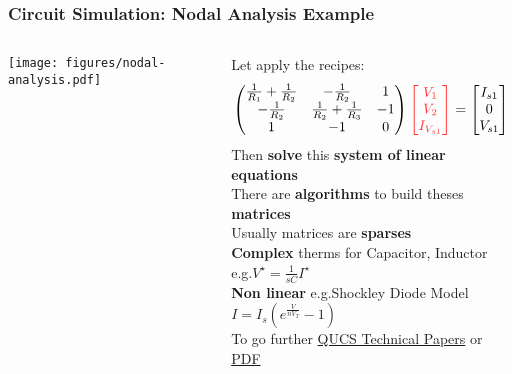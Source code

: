 \begin{frame}
  \frametitle{Circuit Simulation: Nodal Analysis Example}
  \begin{columns}
    \begin{column}{.3\textwidth}
      \begin{center}
        \texttt{[image: figures/nodal-analysis.pdf]}
      \end{center}
    \end{column}
    \begin{column}{.7\textwidth}
      Let apply the recipes: %
      $$
      \begin{pmatrix}
        \frac{1}{R_1}+\frac{1}{R_2} & -\frac{1}{R_2} & 1 \\
        -\frac{1}{R_2} & \frac{1}{R_2}+\frac{1}{R_3} & -1 \\
        1 & -1 & 0
      \end{pmatrix}
      { \color{red!80}
      \begin{bmatrix}
        V_1 \\
        V_2 \\
        I_{V_{s1}}
      \end{bmatrix}
      }
      =
      \begin{bmatrix}
        I_{s1} \\
        0 \\
        V_{s1}
      \end{bmatrix}
      $$
      Then \textbf{solve} this \textbf{system of linear equations} \\[1em]
      There are \textbf{algorithms} to build theses \textbf{matrices} \\
      Usually matrices are \textbf{sparses} \\[1em]
      \textbf{Complex} therms for Capacitor, Inductor e.g.\@ $V^\star = \frac{1}{sC} I^\star$ %
      \\[.5em]
      \textbf{Non linear} e.g.\@ Shockley Diode Model $I = I_s \left( e^{\frac{V}{n V_T}} - 1 \right)$
      \\[1em]
      {\tiny
        To go further \href{http://qucs.sourceforge.net/tech/technical.html}{QUCS Technical Papers}
        or \href{http://qucs.sourceforge.net/docs/technical/technical.pdf}{PDF}
      }
    \end{column}
  \end{columns}
\end{frame}


